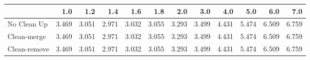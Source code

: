 \begin{tabular}{lrrrrrrrrrrr}
\toprule
{} &   1.0 &   1.2 &   1.4 &   1.6 &   1.8 &   2.0 &   3.0 &   4.0 &   5.0 &   6.0 &   7.0 \\
\midrule
No Clean Up  & 3.469 & 3.051 & 2.971 & 3.032 & 3.055 & 3.293 & 3.499 & 4.431 & 5.474 & 6.509 & 6.759 \\
Clean-merge  & 3.469 & 3.051 & 2.971 & 3.032 & 3.055 & 3.293 & 3.499 & 4.431 & 5.474 & 6.509 & 6.759 \\
Clean-remove & 3.469 & 3.051 & 2.971 & 3.032 & 3.055 & 3.293 & 3.499 & 4.431 & 5.474 & 6.509 & 6.759 \\
\bottomrule
\end{tabular}
